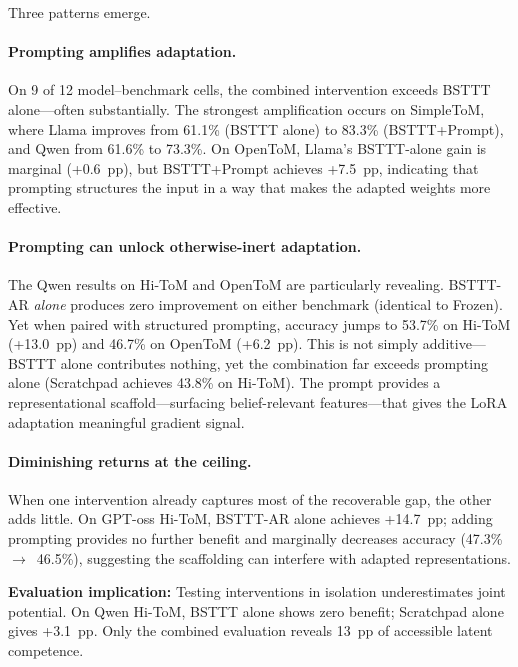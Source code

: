 Three patterns emerge.

\paragraph{Prompting amplifies adaptation.}
On 9 of 12 model--benchmark cells, the combined intervention exceeds BSTTT alone---often substantially.
The strongest amplification occurs on SimpleToM, where Llama improves from 61.1\% (BSTTT alone) to 83.3\% (BSTTT+Prompt), and Qwen from 61.6\% to 73.3\%.
On OpenToM, Llama's BSTTT-alone gain is marginal (+0.6~pp), but BSTTT+Prompt achieves +7.5~pp, indicating that prompting structures the input in a way that makes the adapted weights more effective.

\paragraph{Prompting can unlock otherwise-inert adaptation.}
The Qwen results on Hi-ToM and OpenToM are particularly revealing.
BSTTT-AR \emph{alone} produces zero improvement on either benchmark (identical to Frozen).
Yet when paired with structured prompting, accuracy jumps to 53.7\% on Hi-ToM (+13.0~pp) and 46.7\% on OpenToM (+6.2~pp).
This is not simply additive---BSTTT alone contributes nothing, yet the combination far exceeds prompting alone (Scratchpad achieves 43.8\% on Hi-ToM).
The prompt provides a representational scaffold---surfacing belief-relevant features---that gives the LoRA adaptation meaningful gradient signal.

\paragraph{Diminishing returns at the ceiling.}
When one intervention already captures most of the recoverable gap, the other adds little.
On GPT-oss Hi-ToM, BSTTT-AR alone achieves +14.7~pp; adding prompting provides no further benefit and marginally decreases accuracy (47.3\%~$\rightarrow$~46.5\%), suggesting the scaffolding can interfere with adapted representations.

\begin{tcolorbox}[colback=gray!5, colframe=gray!50, boxrule=0.3pt, left=4pt, right=4pt, top=3pt, bottom=3pt]
\textbf{Evaluation implication:}
Testing interventions in isolation underestimates joint potential.
On Qwen Hi-ToM, BSTTT alone shows zero benefit; Scratchpad alone gives +3.1~pp.
Only the combined evaluation reveals 13~pp of accessible latent competence.
\end{tcolorbox}


